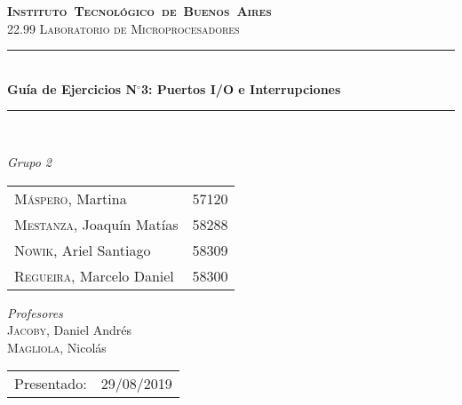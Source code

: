 \begin{titlepage}
\newcommand{\HRule}{\rule{\linewidth}{0.5mm}}
\center
\mbox{\textsc{\LARGE \bfseries {Instituto Tecnol\'ogico de Buenos Aires}}}\\[1.5cm]
\textsc{\Large 22.99 Laboratorio de Microprocesadores}\\[0.5cm]


\HRule \\[0.6cm]
{ \Huge \bfseries Guía de Ejercicios N$^{\circ}$3: Puertos I/O e Interrupciones}\\[0.4cm] %
\HRule \\[1.5cm]


{\large

\emph{Grupo 2}\\
\vspace{3px}

\begin{tabular}{lr} 	
\textsc{M\'aspero}, Martina  & 57120 \\
\textsc{Mestanza}, Joaqu\'in Mat\'ias  & 58288 \\
\textsc{Nowik}, Ariel Santiago  & 58309 \\
\textsc{Regueira}, Marcelo Daniel  & 58300 \\
\end{tabular}

\vspace{20px}

\emph{Profesores}\\
\vspace{3px}
\textsc{Jacoby}, Daniel Andr\'es\\ 	
\textsc{Magliola}, Nicol\'as\\ 	

\vspace{100px}

\begin{tabular}{ll}

Presentado: & 29/08/2019\\

\end{tabular}

}

\vfill

\end{titlepage}